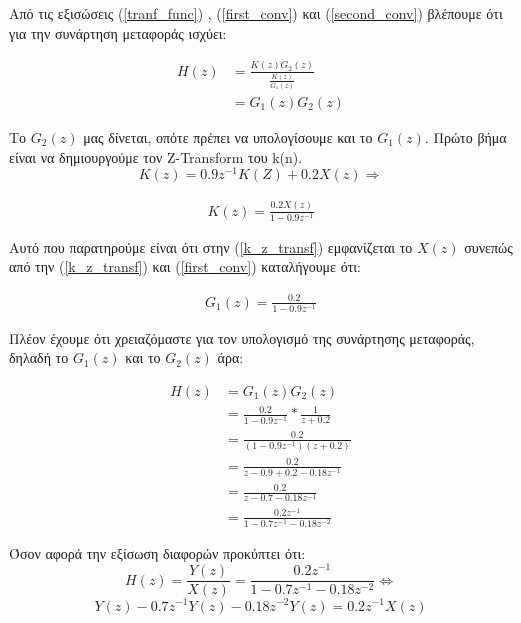 \documentclass[11pt]{article}
\begin{document}
\par \noindent
Από τις εξισώσεις (\ref{tranf_func}) , (\ref{first_conv}) και (\ref{second_conv}) βλέπουμε ότι για την συνάρτηση μεταφοράς ισχύει:

\begin{align}
    H(z)&=\frac{K(z)G_2(z)}{\frac{K(z)}{G_1(z)}} \nonumber \\ 
        &=\boxed{G_1(z)G_2(z)} \label{tranf_func_final}
\end{align}

\par \noindent
Το $G_2(z)$ μας δίνεται, οπότε πρέπει να υπολογίσουμε και το $G_1(z)$. Πρώτο βήμα είναι να δημιουργούμε τον Z-Transform του k(n).
\[ K(z)=0.9z^{-1}K(Z)+0.2X(z) \Rightarrow \]

\begin{align}
    \boxed{K(z)=\frac{0.2X(z)}{1-0.9z^{-1}}} \label{k_z_transf}
\end{align}

\par \noindent
Αυτό που παρατηρούμε είναι ότι στην (\ref{k_z_transf}) εμφανίζεται το $X(z)$ συνεπώς από την (\ref{k_z_transf}) και (\ref{first_conv}) καταλήγουμε ότι:

\begin{align}
    \boxed{G_1(z)=\frac{0.2}{1-0.9z^{-1}}} \label{g_1}
\end{align}

\par \noindent
Πλέον έχουμε ότι χρειαζόμαστε για τον υπολογισμό της συνάρτησης μεταφοράς, δηλαδή το $G_1(z)$ και το $G_2(z)$ άρα:

\begin{align}
    H(z)&=G_1(z)G_2(z) \nonumber \\
    &=\frac{0.2}{1-0.9z^{-1}}*\frac{1}{z+0.2} \nonumber \\
    &=\frac{0.2}{(1-0.9z^{-1})(z+0.2)} \nonumber \\
    &=\frac{0.2}{z-0.9+0.2-0.18z^{-1}} \nonumber \\
    &=\frac{0.2}{z-0.7-0.18z^{-1}} \nonumber \\
    &=\boxed{\frac{0.2z^{-1}}{1-0.7z^{-1}-0.18z^{-2}}}
\end{align}

\par \noindent
Όσον αφορά την εξίσωση διαφορών προκύπτει ότι:
\[ H(z)=\frac{Y(z)}{X(z)}=\frac{0.2z^{-1}}{1-0.7z^{-1}-0.18z^{-2}} \Leftrightarrow \]
\[ Y(z) - 0.7z^{-1}Y(z) -0.18z^{-2}Y(z) = 0.2z^{-1}X(z) \]
\end{document}
